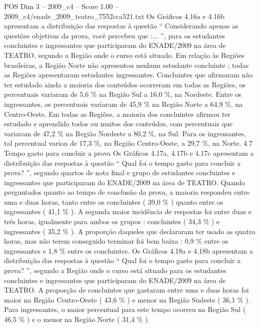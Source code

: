 \begin{textsample}{POS Dim 3 – 2009\_c4 – Score 1.00 – 2009\_c4/enade\_2009\_teatro\_7552cca521.txt}
Os Gráficos 4.16a e 4.16b apresentam a distribuição das respostas à questão “ Considerando apenas as questões objetivas da prova, você percebeu que :... ”, para os estudantes concluintes e ingressantes que participaram do ENADE/2009 na área de TEATRO, segundo a Região onde o curso está situado.
Em relação às Regiões brasileiras, a Região Norte não apresentou nenhum estudante concluinte ; todas as Regiões apresentaram estudantes ingressantes.
Concluintes que afirmaram não ter estudado ainda a maioria dos conteúdos ocorreram em todas as Regiões, os percentuais variaram de 5,6 \% na Região Sul a 16,0 \%, na Nordeste.
Entre os ingressantes, os percentuais variaram de 45,9 \% na Região Norte a 64,9 \%, na Centro-Oeste.
Em todas as Regiões, a maioria dos concluintes afirmou ter estudado e aprendido todos ou muitos dos conteúdos, com percentuais que variaram de 47,2 \% na Região Nordeste a 80,2 \%, na Sul.
Para os ingressantes, tal percentual variou de 17,3 \%, na Região Centro-Oeste, a 29,7 \%, na Norte. 4.7 Tempo gasto para concluir a prova Os Gráficos 4.17a, 4.17b e 4.17c apresentam a distribuição das respostas à questão “ Qual foi o tempo gasto para concluir a prova? ”, segundo quartos de nota final e grupo de estudantes concluintes e ingressantes que participaram do ENADE/2009 na área de TEATRO.
Quando perguntados quanto ao tempo de conclusão da prova, a maioria respondeu entre uma e duas horas, tanto entre os concluintes ( 39,0 \% ) quanto entre os ingressantes ( 41,1 \% ).
A segunda maior incidência de respostas foi entre duas e três horas, igualmente para ambos os grupos : concluintes ( 34,3 \% ) e ingressantes ( 35,2 \% ).
A proporção daqueles que declararam ter usado as quatro horas, mas não terem conseguido terminar foi bem baixa : 0,9 \% entre os ingressantes e 1,8 \% entre os concluintes.
Os Gráficos 4.18a e 4.18b apresentam a distribuição das respostas à questão “ Qual foi o tempo gasto para concluir a prova? ”, segundo a Região onde o curso está situado para os estudantes concluintes e ingressantes que participaram do ENADE/2009 na área de TEATRO.
A proporção de concluintes que gastaram entre uma e duas horas foi maior na Região Centro-Oeste ( 43,6 \% ) e menor na Região Sudeste ( 36,1 \% ).
Para ingressantes, o maior percentual para este tempo ocorreu na Região Sul ( 46,5 \% ) e o menor na Região Norte ( 31,4 \% ).

\end{textsample}
